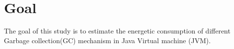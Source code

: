 \section{Goal}
\label{sec:Goal}
The goal of this study is to estimate the energetic consumption of different Garbage collection(GC)\cite{gc} mechanism in Java Virtual machine (JVM)\cite{jvm}.